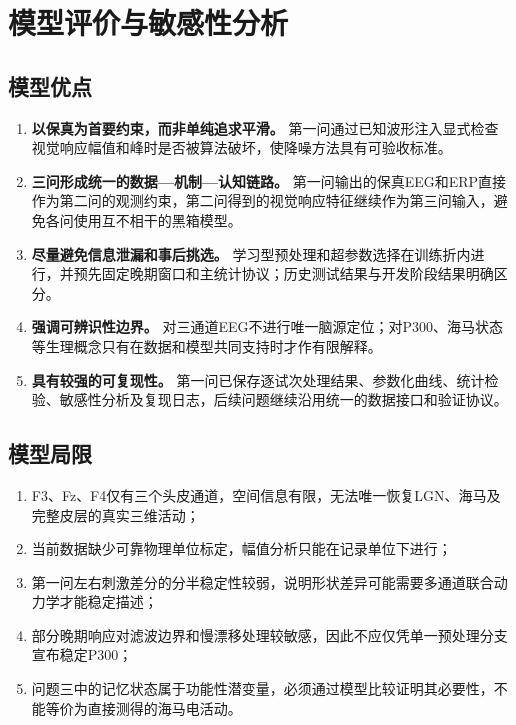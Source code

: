 \section{模型评价与敏感性分析}

\subsection{模型优点}

\begin{enumerate}[label=(\arabic*)]
    \item \textbf{以保真为首要约束，而非单纯追求平滑。} 第一问通过已知波形注入显式检查视觉响应幅值和峰时是否被算法破坏，使降噪方法具有可验收标准。
    \item \textbf{三问形成统一的数据—机制—认知链路。} 第一问输出的保真EEG和ERP直接作为第二问的观测约束，第二问得到的视觉响应特征继续作为第三问输入，避免各问使用互不相干的黑箱模型。
    \item \textbf{尽量避免信息泄漏和事后挑选。} 学习型预处理和超参数选择在训练折内进行，并预先固定晚期窗口和主统计协议；历史测试结果与开发阶段结果明确区分。
    \item \textbf{强调可辨识性边界。} 对三通道EEG不进行唯一脑源定位；对P300、海马状态等生理概念只有在数据和模型共同支持时才作有限解释。
    \item \textbf{具有较强的可复现性。} 第一问已保存逐试次处理结果、参数化曲线、统计检验、敏感性分析及复现日志，后续问题继续沿用统一的数据接口和验证协议。
\end{enumerate}

\subsection{模型局限}

\begin{enumerate}[label=(\arabic*)]
    \item F3、Fz、F4仅有三个头皮通道，空间信息有限，无法唯一恢复LGN、海马及完整皮层的真实三维活动；
    \item 当前数据缺少可靠物理单位标定，幅值分析只能在记录单位下进行；
    \item 第一问左右刺激差分的分半稳定性较弱，说明形状差异可能需要多通道联合动力学才能稳定描述；
    \item 部分晚期响应对滤波边界和慢漂移处理较敏感，因此不应仅凭单一预处理分支宣布稳定P300；
    \item 问题三中的记忆状态属于功能性潜变量，必须通过模型比较证明其必要性，不能等价为直接测得的海马电活动。
\end{enumerate}

